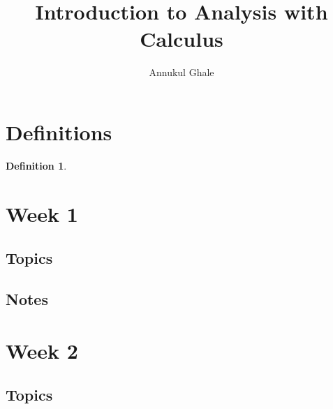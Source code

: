 \documentclass[12pt]{article}
\newtheorem{definition}{Definition}
\begin{document}
\title{\textbf{Introduction to Analysis with Calculus}}
\author{Annukul Ghale}


\maketitle

\tableofcontents
\newpage



\section{Definitions}


\begin{definition}
\end{definition}



\section{Week 1}

\subsection{Topics}



\subsection{Notes}






\section{Week 2}

\subsection{Topics}
\end{document}
